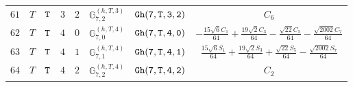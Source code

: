 \documentclass[fleqn,8pt]{jsarticle}
\begin{document}
\begin{table}[ht!]
\begin{center}
\begin{tabular}{cccccccc}
$ 61 $ & $ T $ & $ {\tt T} $ & $ 3 $ & $ 2 $ & $ \mathbb{G}_{7,2}^{(h,T,3)} $ & $ {\tt Gh(7,T,3,2)} $ & $ C_{6} $ \\
$ 62 $ & $ T $ & $ {\tt T} $ & $ 4 $ & $ 0 $ & $ \mathbb{G}_{7,0}^{(h,T,4)} $ & $ {\tt Gh(7,T,4,0)} $ & $ - \frac{15 \sqrt{6} C_{1}}{64} + \frac{19 \sqrt{2} C_{3}}{64} - \frac{\sqrt{22} C_{5}}{64} - \frac{\sqrt{2002} C_{7}}{64} $ \\
$ 63 $ & $ T $ & $ {\tt T} $ & $ 4 $ & $ 1 $ & $ \mathbb{G}_{7,1}^{(h,T,4)} $ & $ {\tt Gh(7,T,4,1)} $ & $ \frac{15 \sqrt{6} S_{1}}{64} + \frac{19 \sqrt{2} S_{3}}{64} + \frac{\sqrt{22} S_{5}}{64} - \frac{\sqrt{2002} S_{7}}{64} $ \\
$ 64 $ & $ T $ & $ {\tt T} $ & $ 4 $ & $ 2 $ & $ \mathbb{G}_{7,2}^{(h,T,4)} $ & $ {\tt Gh(7,T,4,2)} $ & $ C_{2} $ \\
 \hline \hline
\end{tabular}
\end{center}
\end{table}
\end{document}
